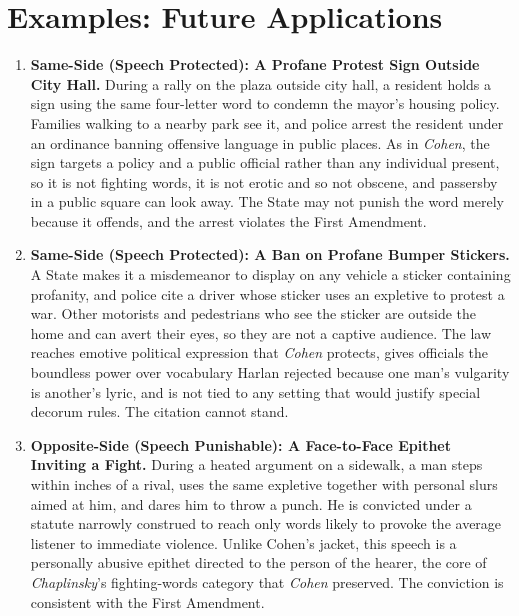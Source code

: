 \documentclass[12pt]{article}
\begin{document}
\section{Examples: Future Applications}
\begin{enumerate}

\item \textbf{Same-Side (Speech Protected): A Profane Protest Sign Outside City Hall.} During a rally on the plaza outside city hall, a resident holds a sign using the same four-letter word to condemn the mayor's housing policy. Families walking to a nearby park see it, and police arrest the resident under an ordinance banning offensive language in public places. As in \textit{Cohen}, the sign targets a policy and a public official rather than any individual present, so it is not fighting words, it is not erotic and so not obscene, and passersby in a public square can look away. The State may not punish the word merely because it offends, and the arrest violates the First Amendment.

\item \textbf{Same-Side (Speech Protected): A Ban on Profane Bumper Stickers.} A State makes it a misdemeanor to display on any vehicle a sticker containing profanity, and police cite a driver whose sticker uses an expletive to protest a war. Other motorists and pedestrians who see the sticker are outside the home and can avert their eyes, so they are not a captive audience. The law reaches emotive political expression that \textit{Cohen} protects, gives officials the boundless power over vocabulary Harlan rejected because one man's vulgarity is another's lyric, and is not tied to any setting that would justify special decorum rules. The citation cannot stand.

\item \textbf{Opposite-Side (Speech Punishable): A Face-to-Face Epithet Inviting a Fight.} During a heated argument on a sidewalk, a man steps within inches of a rival, uses the same expletive together with personal slurs aimed at him, and dares him to throw a punch. He is convicted under a statute narrowly construed to reach only words likely to provoke the average listener to immediate violence. Unlike Cohen's jacket, this speech is a personally abusive epithet directed to the person of the hearer, the core of \textit{Chaplinsky}'s fighting-words category that \textit{Cohen} preserved. The conviction is consistent with the First Amendment.


\end{enumerate}
\end{document}

